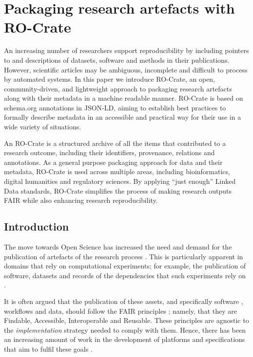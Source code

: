 \section{Packaging research artefacts with RO-Crate}
\label{ch5:packaging-research-artefacts-with-ro-crate}

An increasing number of researchers support reproducibility by including
pointers to and descriptions of datasets, software and methods in their
publications. However, scientific articles may be ambiguous, incomplete
and difficult to process by automated systems. In this paper we
introduce RO-Crate, an open, community-driven, and lightweight approach
to packaging research artefacts along with their metadata in a machine
readable manner. RO-Crate is based on schema.org annotations in \acrshort{JSON-LD},
aiming to establish best practices to formally describe metadata in an
accessible and practical way for their use in a wide variety of
situations.

An \acrfull{RO-Crate} is a structured archive of all the items that contributed to
a research outcome, including their identifiers, provenance, relations
and annotations. As a general purpose packaging approach for data and
their metadata, RO-Crate is used across multiple areas, including
bioinformatics, digital humanities and regulatory sciences. By applying
``just enough'' Linked Data standards, RO-Crate simplifies the process
of making research outputs FAIR while also enhancing research
reproducibility.

\subsection{Introduction}\label{ch5:introduction}

The move towards Open Science has increased the need and demand for the
publication of artefacts of the research process
\cite{Sefton 2021a}. This is
particularly apparent in domains that rely on computational experiments;
for example, the publication of software, datasets and records of the
dependencies that such experiments rely on
\cite{Stodden 2016}.

It is often argued that the publication of these assets, and
specifically software
\cite{Lamprecht 2019}, workflows
\cite{Goble 2020} and data, should
follow the \acrshort{FAIR} principles
\cite{Wilkinson 2016}; namely, that
they are Findable, Accessible, Interoperable and Reusable. These
principles are agnostic to the \emph{implementation} strategy needed to
comply with them. Hence, there has been an increasing amount of work in
the development of platforms and specifications that aim to fulfil these
goals \cite{Mons 2018}.

